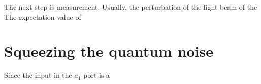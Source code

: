\documentclass[hyperref, a4paper]{article}
\begin{document}
The next step is measurement.
Usually, the perturbation of the light beam of the 
The expectation value of 

\section{Squeezing the quantum noise}\label{sec:squeezing}

Since the input in the $a_1$ port is a 



\end{document}
